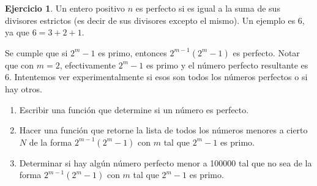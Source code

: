 \documentclass[a4paper,12pt]{book}
\theoremstyle{definition}
\newtheorem{ejercicio}{Ejercicio}
\begin{document}
	\begin{ejercicio}
		Un entero positivo $n$ es perfecto si es igual a la suma de sus divisores estrictos (es decir de sus divisores excepto el mismo). Un ejemplo es $6$, ya que $6=3+2+1$.
		
		Se cumple que si $2^m-1$ es primo, entonces $2^{m-1}(2^m-1)$ es perfecto. Notar que con $m=2$, efectivamente $2^m-1$ es primo y el número perfecto resultante es $6$. Intentemos ver experimentalmente si esos son todos los números perfectos o si hay otros.
		
		\begin{enumerate}
			\item Escribir una función que determine si un número es perfecto.
			
			\item Hacer una función que retorne la lista de todos los números menores a cierto $N$ de la forma $2^{m-1}(2^m-1)$ con $m$ tal que $2^m-1$ es primo.
			
			\item Determinar si hay algún número perfecto menor a 100000 tal que no sea de la forma $2^{m-1}(2^m-1)$ con $m$ tal que $2^m-1$ es primo.
		\end{enumerate}
	\end{ejercicio}
	
\end{document}
